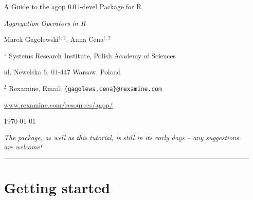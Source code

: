 \documentclass[11pt]{article}\usepackage{graphicx, color}
\newcommand{\hlnumber}[1]{\textcolor[rgb]{0,0,0}{#1}}%
\newcommand{\hlfunctioncall}[1]{\textcolor[rgb]{0.501960784313725,0,0.329411764705882}{\textbf{#1}}}%
\newcommand{\hlstring}[1]{\textcolor[rgb]{0.6,0.6,1}{#1}}%
\newcommand{\hlkeyword}[1]{\textcolor[rgb]{0,0,0}{\textbf{#1}}}%
\newcommand{\hlargument}[1]{\textcolor[rgb]{0.690196078431373,0.250980392156863,0.0196078431372549}{#1}}%
\newcommand{\hlcomment}[1]{\textcolor[rgb]{0.180392156862745,0.6,0.341176470588235}{#1}}%
\newcommand{\hlroxygencomment}[1]{\textcolor[rgb]{0.43921568627451,0.47843137254902,0.701960784313725}{#1}}%
\newcommand{\hlformalargs}[1]{\textcolor[rgb]{0.690196078431373,0.250980392156863,0.0196078431372549}{#1}}%
\newcommand{\hleqformalargs}[1]{\textcolor[rgb]{0.690196078431373,0.250980392156863,0.0196078431372549}{#1}}%
\newcommand{\hlassignement}[1]{\textcolor[rgb]{0,0,0}{\textbf{#1}}}%
\newcommand{\hlpackage}[1]{\textcolor[rgb]{0.588235294117647,0.709803921568627,0.145098039215686}{#1}}%
\newcommand{\hlslot}[1]{\textit{#1}}%
\newcommand{\hlsymbol}[1]{\textcolor[rgb]{0,0,0}{#1}}%
\newcommand{\hlprompt}[1]{\textcolor[rgb]{0.2,0.2,0.2}{#1}}%
\newcommand{\package}[1]{\textsf{#1}\xspace}
\newcommand{\lang}[1]{\textsf{#1}\xspace}
\newcommand{\R}{\lang{R}}
\theoremstyle{remark}
\theoremstyle{definition}
\begin{document}
\begin{center}
{\LARGE\sf A Guide to the \package{agop} {0.01-devel} Package for \R}

{\large\sf\textit{Aggregation Operators in \R}}

\bigskip
{\large Marek Gagolewski${}^{1,2}$, Anna Cena${}^{1,2}$}

${}^{1}$ Systems Research Institute, Polish Academy of Sciences

ul. Newelska 6, 01-447 Warsaw, Poland

${}^{2}$ Rexamine, Email: \texttt{\{gagolews,cena\}@rexamine.com}

\href{http://www.rexamine.com/resources/agop/}%
{www.rexamine.com/resources/agop/}

\bigskip
\today


\medskip
\textit{The package, as well as this tutorial, is still in its early
days -- any suggestions are welcome!}
\end{center}





\bigskip\hrule\bigskip
\tableofcontents









\section{Getting started}
\end{document}
